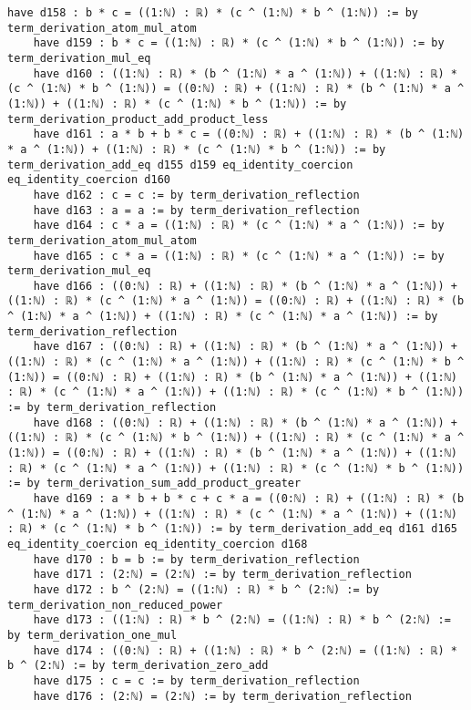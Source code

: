 \documentclass{article}
\begin{document}
\begin{tcolorbox}[colback=white!10, width=\linewidth]
\begin{lstlisting}[language=Lean4]
    have d158 : b * c = ((1:ℕ) : ℝ) * (c ^ (1:ℕ) * b ^ (1:ℕ)) := by term_derivation_atom_mul_atom
    have d159 : b * c = ((1:ℕ) : ℝ) * (c ^ (1:ℕ) * b ^ (1:ℕ)) := by term_derivation_mul_eq
    have d160 : ((1:ℕ) : ℝ) * (b ^ (1:ℕ) * a ^ (1:ℕ)) + ((1:ℕ) : ℝ) * (c ^ (1:ℕ) * b ^ (1:ℕ)) = ((0:ℕ) : ℝ) + ((1:ℕ) : ℝ) * (b ^ (1:ℕ) * a ^ (1:ℕ)) + ((1:ℕ) : ℝ) * (c ^ (1:ℕ) * b ^ (1:ℕ)) := by term_derivation_product_add_product_less
    have d161 : a * b + b * c = ((0:ℕ) : ℝ) + ((1:ℕ) : ℝ) * (b ^ (1:ℕ) * a ^ (1:ℕ)) + ((1:ℕ) : ℝ) * (c ^ (1:ℕ) * b ^ (1:ℕ)) := by term_derivation_add_eq d155 d159 eq_identity_coercion eq_identity_coercion d160
    have d162 : c = c := by term_derivation_reflection
    have d163 : a = a := by term_derivation_reflection
    have d164 : c * a = ((1:ℕ) : ℝ) * (c ^ (1:ℕ) * a ^ (1:ℕ)) := by term_derivation_atom_mul_atom
    have d165 : c * a = ((1:ℕ) : ℝ) * (c ^ (1:ℕ) * a ^ (1:ℕ)) := by term_derivation_mul_eq
    have d166 : ((0:ℕ) : ℝ) + ((1:ℕ) : ℝ) * (b ^ (1:ℕ) * a ^ (1:ℕ)) + ((1:ℕ) : ℝ) * (c ^ (1:ℕ) * a ^ (1:ℕ)) = ((0:ℕ) : ℝ) + ((1:ℕ) : ℝ) * (b ^ (1:ℕ) * a ^ (1:ℕ)) + ((1:ℕ) : ℝ) * (c ^ (1:ℕ) * a ^ (1:ℕ)) := by term_derivation_reflection
    have d167 : ((0:ℕ) : ℝ) + ((1:ℕ) : ℝ) * (b ^ (1:ℕ) * a ^ (1:ℕ)) + ((1:ℕ) : ℝ) * (c ^ (1:ℕ) * a ^ (1:ℕ)) + ((1:ℕ) : ℝ) * (c ^ (1:ℕ) * b ^ (1:ℕ)) = ((0:ℕ) : ℝ) + ((1:ℕ) : ℝ) * (b ^ (1:ℕ) * a ^ (1:ℕ)) + ((1:ℕ) : ℝ) * (c ^ (1:ℕ) * a ^ (1:ℕ)) + ((1:ℕ) : ℝ) * (c ^ (1:ℕ) * b ^ (1:ℕ)) := by term_derivation_reflection
    have d168 : ((0:ℕ) : ℝ) + ((1:ℕ) : ℝ) * (b ^ (1:ℕ) * a ^ (1:ℕ)) + ((1:ℕ) : ℝ) * (c ^ (1:ℕ) * b ^ (1:ℕ)) + ((1:ℕ) : ℝ) * (c ^ (1:ℕ) * a ^ (1:ℕ)) = ((0:ℕ) : ℝ) + ((1:ℕ) : ℝ) * (b ^ (1:ℕ) * a ^ (1:ℕ)) + ((1:ℕ) : ℝ) * (c ^ (1:ℕ) * a ^ (1:ℕ)) + ((1:ℕ) : ℝ) * (c ^ (1:ℕ) * b ^ (1:ℕ)) := by term_derivation_sum_add_product_greater
    have d169 : a * b + b * c + c * a = ((0:ℕ) : ℝ) + ((1:ℕ) : ℝ) * (b ^ (1:ℕ) * a ^ (1:ℕ)) + ((1:ℕ) : ℝ) * (c ^ (1:ℕ) * a ^ (1:ℕ)) + ((1:ℕ) : ℝ) * (c ^ (1:ℕ) * b ^ (1:ℕ)) := by term_derivation_add_eq d161 d165 eq_identity_coercion eq_identity_coercion d168
    have d170 : b = b := by term_derivation_reflection
    have d171 : (2:ℕ) = (2:ℕ) := by term_derivation_reflection
    have d172 : b ^ (2:ℕ) = ((1:ℕ) : ℝ) * b ^ (2:ℕ) := by term_derivation_non_reduced_power
    have d173 : ((1:ℕ) : ℝ) * b ^ (2:ℕ) = ((1:ℕ) : ℝ) * b ^ (2:ℕ) := by term_derivation_one_mul
    have d174 : ((0:ℕ) : ℝ) + ((1:ℕ) : ℝ) * b ^ (2:ℕ) = ((1:ℕ) : ℝ) * b ^ (2:ℕ) := by term_derivation_zero_add
    have d175 : c = c := by term_derivation_reflection
    have d176 : (2:ℕ) = (2:ℕ) := by term_derivation_reflection

\end{lstlisting}
\end{tcolorbox}
\end{document}
